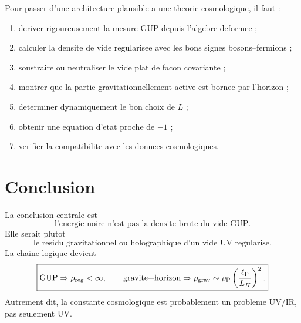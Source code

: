 \documentclass[11pt,a4paper]{article}
\newcommand{\rhoP}{\rho_{\rm P}}
\newcommand{\ellP}{\ell_{\rm P}}
\newcommand{\rhoReg}{\rho_{\rm reg}}
\newcommand{\LH}{L_H}
\begin{document}
Pour passer d'une architecture plausible a une theorie cosmologique, il faut :
\begin{enumerate}
 \item deriver rigoureusement la mesure GUP depuis l'algebre deformee ;
 \item calculer la densite de vide regularisee avec les bons signes
 bosons--fermions ;
 \item soustraire ou neutraliser le vide plat de facon covariante ;
 \item montrer que la partie gravitationnellement active est bornee par
 l'horizon ;
 \item determiner dynamiquement le bon choix de $L$ ;
 \item obtenir une equation d'etat proche de $-1$ ;
 \item verifier la compatibilite avec les donnees cosmologiques.
\end{enumerate}

\section{Conclusion}

La conclusion centrale est
\begin{equation}
\boxed{
\text{l'energie noire n'est pas la densite brute du vide GUP.}
}
\end{equation}
Elle serait plutot
\begin{equation}
\boxed{
\text{le residu gravitationnel ou holographique d'un vide UV regularise.}
}
\end{equation}
La chaine logique devient
\begin{equation}
\boxed{
\text{GUP}\Rightarrow\rhoReg<\infty,
\qquad
\text{gravite+horizon}\Rightarrow
\rho_{\rm grav}\sim\rhoP\left(\frac{\ellP}{\LH}\right)^2.
}
\end{equation}
Autrement dit, la constante cosmologique est probablement un probleme UV/IR,
pas seulement UV.
\end{document}

